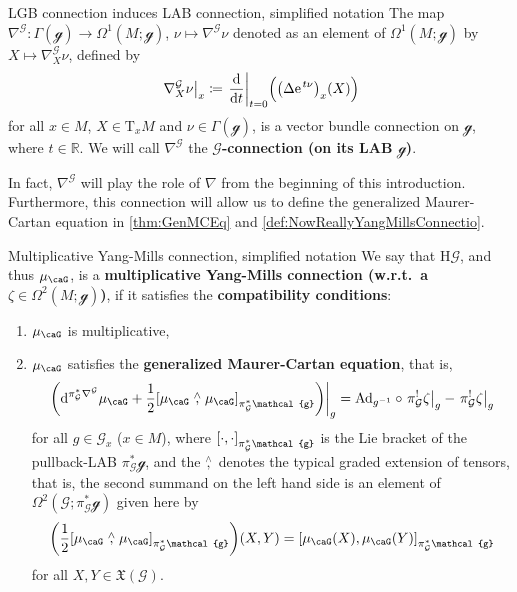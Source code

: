 \documentclass[reqno,a4paper,oneside]{amsart}
\newcommand\mutot{\mu_\caG}
\newcommand{\e}{\ensuremath{\mathrm{e\;\!}}}
\theoremstyle{plain}
\theoremstyle{remark}
\theoremstyle{definition}
\begin{document}
\begin{propositions*}{LGB connection induces LAB connection, simplified notation}
The map $\nabla^{\mathcal{G}}\colon \Gamma(\mathcal{g}) \to \Omega^1(M; \mathcal{g})$, $\nu \mapsto \nabla^{\mathcal{G}}\nu$ denoted as an element of $\Omega^1(M; \mathcal{g})$ by $X \mapsto \nabla^{\mathcal{G}}_X \nu$, defined by
\begin{equation*}
\mleft.\nabla^{\mathcal{G}}_X \nu\mright|_x
\coloneqq
\mleft.\frac{\mathrm{d}}{\mathrm{d}t}\mright|_{t=0} \Bigl( \mleft(\Delta \e^{t \nu}\mright)_x (X) \Bigr)
\end{equation*}
for all $x \in M$, $X \in \mathrm{T}_xM$ and $\nu \in \Gamma(\mathcal{g})$, is a vector bundle connection on $\mathcal{g}$, where $t \in \mathbb{R}$. We will call $\nabla^{\mathcal{G}}$ the \textbf{$\mathcal{G}$-connection (on its LAB $\mathcal{g}$)}.
\end{propositions*}

In fact, $\nabla^{\mathcal{G}}$ will play the role of $\nabla$ from the beginning of this introduction. Furthermore, this connection will allow us to define the generalized Maurer-Cartan equation in \ref{thm:GenMCEq} and \ref{def:NowReallyYangMillsConnectio}.

\begin{definitions*}{Multiplicative Yang-Mills connection, simplified notation}
We say that $\mathrm{H}\mathcal{G}$, and thus $\mutot$, is a \textbf{multiplicative Yang-Mills connection (w.r.t.\ a $\zeta \in \Omega^2(M; \mathcal{g})$)}, if it satisfies the \textbf{compatibility conditions}:
\begin{enumerate}
	\item $\mutot$ is multiplicative,
	\item $\mutot$ satisfies the \textbf{generalized Maurer-Cartan equation}, that is,
	\begin{equation*}
	\mleft.\mleft(\mathrm{d}^{\pi_{\mathcal{G}}^*\nabla^{\mathcal{G}}} \mutot
	+ \frac{1}{2} \mleft[ \mutot \stackrel{\wedge}{,} \mutot \mright]_{\pi_{\mathcal{G}}^*\mathcal{g}} \mright)\mright|_g
=
\mathrm{Ad}_{g^{-1}} \circ \mleft.\pi_{\mathcal{G}}^!\zeta\mright|_g
	- \mleft.\pi_{\mathcal{G}}^!\zeta\mright|_g
	\end{equation*}
	for all $g \in \mathcal{G}_x$ ($x \in M$), where $\mleft[\cdot, \cdot\mright]_{\pi_{\mathcal{G}}^*\mathcal{g}}$ is the Lie bracket of the pullback-LAB $\pi_{\mathcal{G}}^*\mathcal{g}$, and the $\stackrel{\wedge}{,}$ denotes the typical graded extension of tensors, that is, the second summand on the left hand side is an element of $\Omega^2(\mathcal{G}; \pi_{\mathcal{G}}^*\mathcal{g})$ given here by
	\begin{equation*}
	\mleft(\frac{1}{2} \mleft[ \mutot \stackrel{\wedge}{,} \mutot \mright]_{\pi_{\mathcal{G}}^*\mathcal{g}} \mright) (X, Y)
	=
	\mleft[ \mutot(X), \mutot(Y) \mright]_{\pi_{\mathcal{G}}^*\mathcal{g}}
	\end{equation*}
	for all $X, Y \in \mathfrak{X}(\mathcal{G})$.
\end{enumerate}
\end{definitions*}
\end{document}
